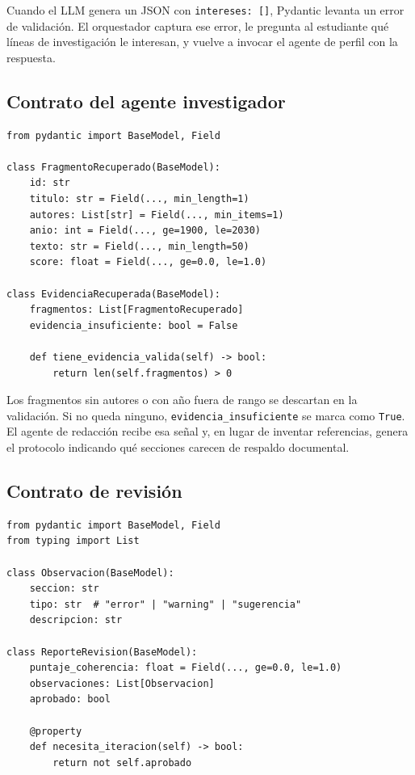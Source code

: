 \documentclass[12pt, a4paper]{article}
\begin{document}
Cuando el LLM genera un JSON con \texttt{intereses: []}, Pydantic levanta
un error de validación. El orquestador captura ese error, le pregunta al
estudiante qué líneas de investigación le interesan, y vuelve a invocar
el agente de perfil con la respuesta.

\subsection{Contrato del agente investigador}

\begin{lstlisting}[style=python]
from pydantic import BaseModel, Field

class FragmentoRecuperado(BaseModel):
    id: str
    titulo: str = Field(..., min_length=1)
    autores: List[str] = Field(..., min_items=1)
    anio: int = Field(..., ge=1900, le=2030)
    texto: str = Field(..., min_length=50)
    score: float = Field(..., ge=0.0, le=1.0)

class EvidenciaRecuperada(BaseModel):
    fragmentos: List[FragmentoRecuperado]
    evidencia_insuficiente: bool = False

    def tiene_evidencia_valida(self) -> bool:
        return len(self.fragmentos) > 0
\end{lstlisting}

Los fragmentos sin autores o con año fuera de rango se descartan en la
validación. Si no queda ninguno, \texttt{evidencia\_insuficiente} se marca
como \texttt{True}. El agente de redacción recibe esa señal y, en lugar
de inventar referencias, genera el protocolo indicando qué secciones
carecen de respaldo documental.

\subsection{Contrato de revisión}

\begin{lstlisting}[style=python]
from pydantic import BaseModel, Field
from typing import List

class Observacion(BaseModel):
    seccion: str
    tipo: str  # "error" | "warning" | "sugerencia"
    descripcion: str

class ReporteRevision(BaseModel):
    puntaje_coherencia: float = Field(..., ge=0.0, le=1.0)
    observaciones: List[Observacion]
    aprobado: bool

    @property
    def necesita_iteracion(self) -> bool:
        return not self.aprobado
\end{lstlisting}
\end{document}
